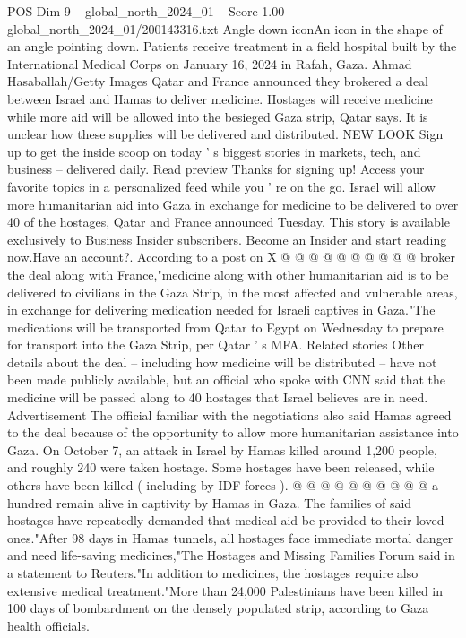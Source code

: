 \begin{textsample}{POS Dim 9 – global\_north\_2024\_01 – Score 1.00 – global\_north\_2024\_01/200143316.txt}  \label{ex:f9_pos_262}
Angle down iconAn icon in the shape of an angle pointing down.
Patients receive treatment in a field hospital built by the International Medical Corps on January 16, 2024 in Rafah, Gaza.
Ahmad Hasaballah/Getty Images Qatar and France announced they brokered a deal between Israel and Hamas to deliver medicine.
Hostages will receive medicine while more aid will be allowed into the besieged Gaza strip, Qatar says.
It is unclear how these supplies will be delivered and distributed.
NEW LOOK Sign up to get the inside scoop on today ' s biggest stories in markets, tech, and business -- delivered daily.
Read preview Thanks for signing up!
Access your favorite topics in a personalized feed while you ' re on the go.
Israel will allow more humanitarian aid into Gaza in exchange for medicine to be delivered to over 40 of the hostages, Qatar and France announced Tuesday.
This story is available exclusively to Business Insider subscribers.
Become an Insider and start reading now.Have an account?.
According to a post on X @ @ @ @ @ @ @ @ @ @ broker the deal along with France,"medicine along with other humanitarian aid is to be delivered to civilians in the Gaza Strip, in the most affected and vulnerable areas, in exchange for delivering medication needed for Israeli captives in Gaza."The medications will be transported from Qatar to Egypt on Wednesday to prepare for transport into the Gaza Strip, per Qatar ' s MFA.
Related stories Other details about the deal -- including how medicine will be distributed -- have not been made publicly available, but an official who spoke with CNN said that the medicine will be passed along to 40 hostages that Israel believes are in need.
Advertisement The official familiar with the negotiations also said Hamas agreed to the deal because of the opportunity to allow more humanitarian assistance into Gaza.
On October 7, an attack in Israel by Hamas killed around 1,200 people, and roughly 240 were taken hostage.
Some hostages have been released, while others have been killed ( including by IDF forces ). @ @ @ @ @ @ @ @ @ @ a hundred remain alive in captivity by Hamas in Gaza.
The families of said hostages have repeatedly demanded that medical aid be provided to their loved ones."After 98 days in Hamas tunnels, all hostages face immediate mortal danger and need life-saving medicines,"The Hostages and Missing Families Forum said in a statement to Reuters."In addition to medicines, the hostages require also extensive medical treatment."More than 24,000 Palestinians have been killed in 100 days of bombardment on the densely populated strip, according to Gaza health officials.

\end{textsample}
